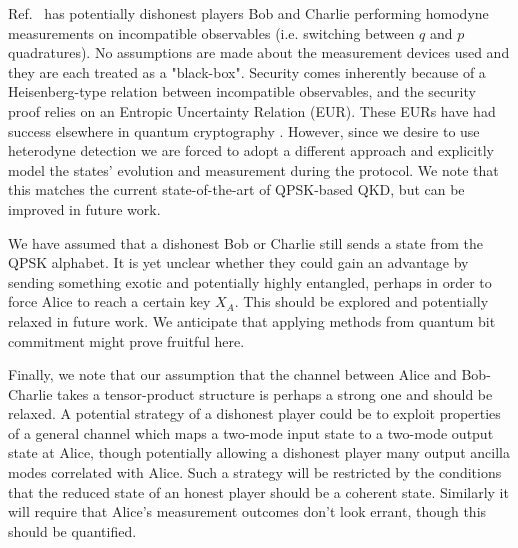Ref.~\cite{Kogias2017} has potentially dishonest players Bob and Charlie performing homodyne measurements on incompatible observables (i.e. switching between $q$ and $p$ quadratures). No assumptions are made about the measurement devices used and they are each treated as a "black-box". Security comes inherently because of a Heisenberg-type relation between incompatible observables, and the security proof relies on an Entropic Uncertainty Relation (EUR). These EURs have had success elsewhere in quantum cryptography . However, since we desire to use heterodyne detection we are forced to adopt a different approach and explicitly model the states' evolution and measurement during the protocol. We note that this matches the current state-of-the-art of QPSK-based QKD, but can be improved in future work.

We have assumed that a dishonest Bob or Charlie still sends a state from the QPSK alphabet. It is yet unclear whether they could gain an advantage by sending something exotic and potentially highly entangled, perhaps in order to force Alice to reach a certain key $X_A$. This should be explored and potentially relaxed in future work. We anticipate that applying methods from quantum bit commitment might prove fruitful here. 

Finally, we note that our assumption that the channel between Alice and Bob-Charlie takes a tensor-product structure is perhaps a strong one and should be relaxed. A potential strategy of a dishonest player could be to exploit properties of a general channel which maps a two-mode input state to a two-mode output state at Alice, though potentially allowing a dishonest player many output ancilla modes correlated with Alice. Such a strategy will be restricted by the conditions that the reduced state of an honest player should be a coherent state. Similarly it will require that Alice's measurement outcomes don't look errant, though this should be quantified.








